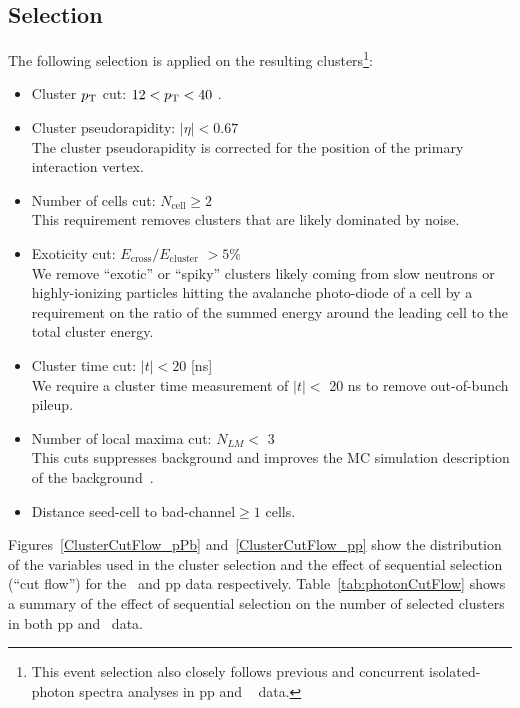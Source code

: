 \subsection{Selection}
The following selection is applied on the resulting clusters\footnote{This event selection also closely follows previous and concurrent isolated-photon spectra analyses in pp and \pPb~ data.}:

\begin{itemize}
\item Cluster $p_{\mathrm{T}}$ cut:  $12< p_{\mathrm{T}} < 40$ \GeVc.
\item Cluster pseudorapidity: $|\eta| <0.67$\\
The cluster pseudorapidity is corrected for the position of the primary interaction vertex. 
\item Number of cells cut: $N_{\mathrm{cell}}\geq2$\\
This requirement removes clusters that are likely dominated by noise. 
\item Exoticity cut: $E_{\mathrm{cross}}/E_{\mathrm{cluster}}$ $> 5\%$\\
We remove ``exotic'' or ``spiky'' clusters likely coming from slow neutrons or highly-ionizing particles hitting the avalanche photo-diode of a cell by a requirement on the ratio of the summed energy around the leading cell to the total cluster energy.
\item Cluster time cut:  $|t|<20$ [ns]\\
We require a cluster time measurement of $|t|<$ 20 ns to remove out-of-bunch pileup. 
\item Number of local maxima cut: $N_{LM}<$ 3\\
This cuts suppresses background and improves the MC simulation description of the background~\cite{Acharya:2019jkx}.  
\item Distance seed-cell to bad-channel$\geq 1$ cells.
\end{itemize}

Figures~\ref{ClusterCutFlow_pPb} and~\ref{ClusterCutFlow_pp} show the distribution of the variables used in the cluster selection and the effect of sequential selection (``cut flow'') for the \pPb~and pp data respectively. Table~\ref{tab:photonCutFlow} shows a summary of the effect of sequential selection on the number of selected clusters in both pp and \pPb~data. 

